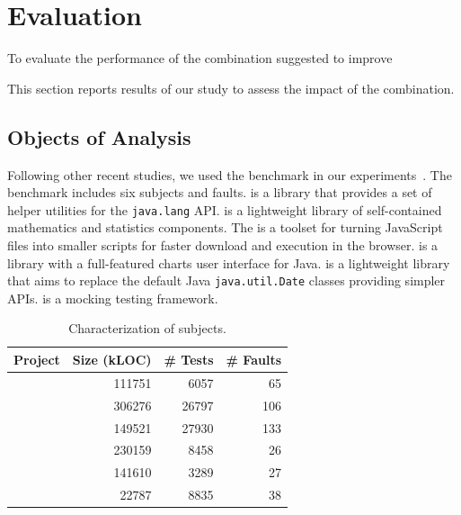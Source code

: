 \documentclass{article}
\begin{document}
\section{Evaluation}
\label{sec:eval}


To evaluate the performance of the \comb{} combination
suggested to improve \sfl{}

This section reports results of our study to assess the impact of the
\comb{} combination.

\subsection{Objects of Analysis}

Following other recent studies, we used the \dfj{} benchmark in our
experiments~\cite{just-defects4j-issta2014}. The \dfj{} benchmark
includes six subjects and \numFaults{} faults.
\lang{} is a library
that provides a set of helper utilities for the {\small\texttt{java.lang}}
API. \cmath{} is a lightweight library of self-contained
mathematics and statistics components. The \closure{} is a toolset for
turning JavaScript files into smaller scripts for faster
download and execution in the browser. \chart{} is a library with a
full-featured charts user interface for Java. \jtime{} is a
lightweight library that aims to replace the default Java
{\small\texttt{java.util.Date}} classes providing simpler APIs. \mockito{} is
a mocking testing framework.

\newcommand{\cgray}[1]{\cellcolor{gray!25}#1}
\begin{table}[h]
  \centering
  \setlength{\tabcolsep}{4pt}
    \begin{tabular}{lrrr}
      \toprule
      Project            & Size (kLOC) & \# Tests & \# Faults \\ %
      \midrule
      \lang{}            & 111751  & 6057 & 65       \\   %
      \cmath{}           & 306276  & 26797 & 106     \\   %
      \closure{}         & 149521  & 27930  & 133     \\   %
      \chart{}           & 230159  & 8458 & 26      \\  %
      \jtime{}           & 141610  & 3289 & 27       \\   %
      \mockito{}         & 22787  & 8835 & 38    \\     %
      \bottomrule
  \end{tabular}
\caption {Characterization of \dfj{} subjects.}
\end{table}
\normalsize
\end{document}
